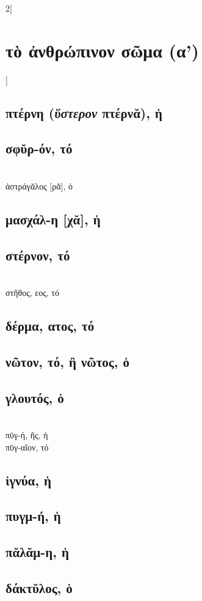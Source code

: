 \documentclass{book}
\begin{document}
\begin{multicols}{2}[\section{τὸ ἀνθρώπινον σῶμα (α')}]
\subsection{πτέρνη (\textit{ὕστερον} πτέρνᾰ), ἡ}
\subsection{σφῠρ-όν, τό}                    ~\\
ἀστράγᾰλος [ρᾰ], ὁ 
\subsection{μασχάλ-η [χᾰ], ἡ}     
\subsection{στέρνον, τό}                    ~\\
στῆθος, εος, τό     
\subsection{δέρμα, ατος, τό}
\subsection{νῶτον, τό, ἢ νῶτος, ὁ}
\subsection{γλουτός, ὁ}           ~\\
πῡγ-ή, ῆς, ἡ \\
πῡγ-αῖον, τό 
\subsection{ἰγνύα, ἡ}
\subsection{πυγμ-ή, ἡ}
\subsection{πᾰλᾰμ-η, ἡ}
\subsection{δάκτῠλος, ὁ}

\end{multicols}
\end{document}
